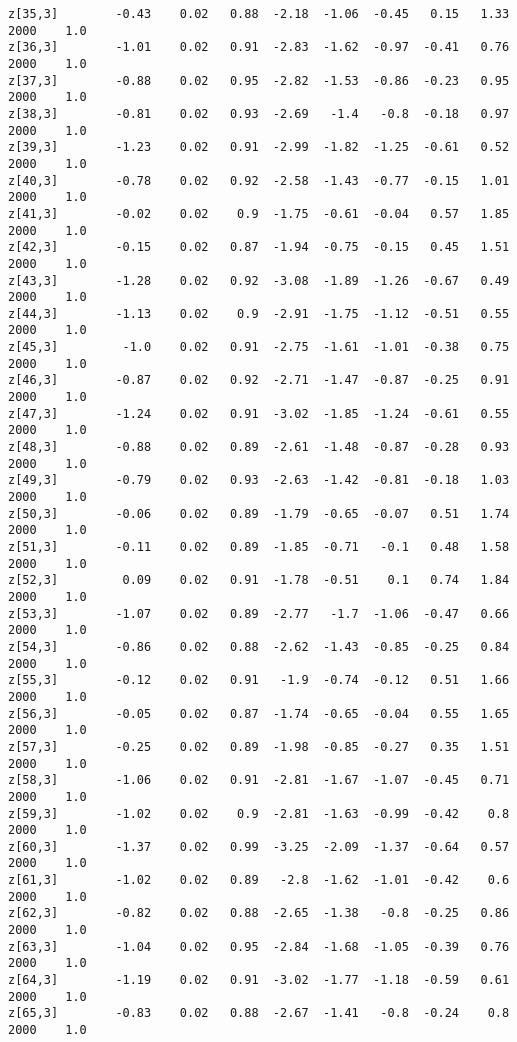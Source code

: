 \documentclass[11pt]{article}
\begin{document}
\begin{Verbatim}[commandchars=\\\{\}]
z[35,3]        -0.43    0.02   0.88  -2.18  -1.06  -0.45   0.15   1.33   2000    1.0
z[36,3]        -1.01    0.02   0.91  -2.83  -1.62  -0.97  -0.41   0.76   2000    1.0
z[37,3]        -0.88    0.02   0.95  -2.82  -1.53  -0.86  -0.23   0.95   2000    1.0
z[38,3]        -0.81    0.02   0.93  -2.69   -1.4   -0.8  -0.18   0.97   2000    1.0
z[39,3]        -1.23    0.02   0.91  -2.99  -1.82  -1.25  -0.61   0.52   2000    1.0
z[40,3]        -0.78    0.02   0.92  -2.58  -1.43  -0.77  -0.15   1.01   2000    1.0
z[41,3]        -0.02    0.02    0.9  -1.75  -0.61  -0.04   0.57   1.85   2000    1.0
z[42,3]        -0.15    0.02   0.87  -1.94  -0.75  -0.15   0.45   1.51   2000    1.0
z[43,3]        -1.28    0.02   0.92  -3.08  -1.89  -1.26  -0.67   0.49   2000    1.0
z[44,3]        -1.13    0.02    0.9  -2.91  -1.75  -1.12  -0.51   0.55   2000    1.0
z[45,3]         -1.0    0.02   0.91  -2.75  -1.61  -1.01  -0.38   0.75   2000    1.0
z[46,3]        -0.87    0.02   0.92  -2.71  -1.47  -0.87  -0.25   0.91   2000    1.0
z[47,3]        -1.24    0.02   0.91  -3.02  -1.85  -1.24  -0.61   0.55   2000    1.0
z[48,3]        -0.88    0.02   0.89  -2.61  -1.48  -0.87  -0.28   0.93   2000    1.0
z[49,3]        -0.79    0.02   0.93  -2.63  -1.42  -0.81  -0.18   1.03   2000    1.0
z[50,3]        -0.06    0.02   0.89  -1.79  -0.65  -0.07   0.51   1.74   2000    1.0
z[51,3]        -0.11    0.02   0.89  -1.85  -0.71   -0.1   0.48   1.58   2000    1.0
z[52,3]         0.09    0.02   0.91  -1.78  -0.51    0.1   0.74   1.84   2000    1.0
z[53,3]        -1.07    0.02   0.89  -2.77   -1.7  -1.06  -0.47   0.66   2000    1.0
z[54,3]        -0.86    0.02   0.88  -2.62  -1.43  -0.85  -0.25   0.84   2000    1.0
z[55,3]        -0.12    0.02   0.91   -1.9  -0.74  -0.12   0.51   1.66   2000    1.0
z[56,3]        -0.05    0.02   0.87  -1.74  -0.65  -0.04   0.55   1.65   2000    1.0
z[57,3]        -0.25    0.02   0.89  -1.98  -0.85  -0.27   0.35   1.51   2000    1.0
z[58,3]        -1.06    0.02   0.91  -2.81  -1.67  -1.07  -0.45   0.71   2000    1.0
z[59,3]        -1.02    0.02    0.9  -2.81  -1.63  -0.99  -0.42    0.8   2000    1.0
z[60,3]        -1.37    0.02   0.99  -3.25  -2.09  -1.37  -0.64   0.57   2000    1.0
z[61,3]        -1.02    0.02   0.89   -2.8  -1.62  -1.01  -0.42    0.6   2000    1.0
z[62,3]        -0.82    0.02   0.88  -2.65  -1.38   -0.8  -0.25   0.86   2000    1.0
z[63,3]        -1.04    0.02   0.95  -2.84  -1.68  -1.05  -0.39   0.76   2000    1.0
z[64,3]        -1.19    0.02   0.91  -3.02  -1.77  -1.18  -0.59   0.61   2000    1.0
z[65,3]        -0.83    0.02   0.88  -2.67  -1.41   -0.8  -0.24    0.8   2000    1.0

\end{Verbatim}
\end{document}
